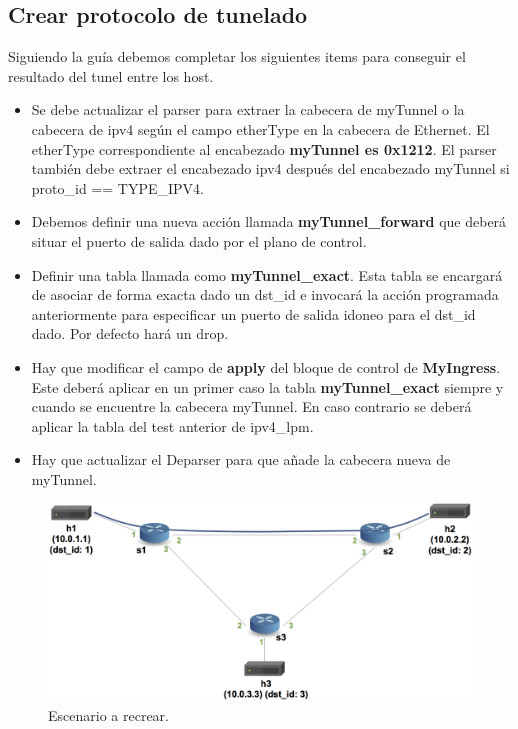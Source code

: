\subsection{Crear protocolo de tunelado}
Siguiendo la guía debemos completar los siguientes items para conseguir el resultado del tunel entre los host.
\begin{itemize}
    \item Se debe actualizar el parser para extraer la cabecera de  myTunnel o la cabecera de  ipv4 según el campo etherType en la cabecera de  Ethernet. El etherType correspondiente al encabezado \textbf{myTunnel es 0x1212}. El parser también debe extraer el encabezado ipv4 después del encabezado myTunnel si proto\_id == TYPE\_IPV4.
    
    \item  Debemos definir una nueva acción llamada \textbf{myTunnel\_forward} que deberá situar el puerto de salida dado por el plano de control.
    
    \item Definir una tabla llamada como \textbf{myTunnel\_exact}. Esta tabla se encargará de asociar de forma exacta dado un dst\_id e invocará la acción programada anteriormente para especificar un puerto de salida idoneo para el dst\_id dado. Por defecto hará un drop.
    
    \item Hay que modificar el campo de \textbf{apply} del bloque de control de \textbf{MyIngress}. Este deberá aplicar en un primer caso la tabla \textbf{myTunnel\_exact} siempre y cuando se encuentre la cabecera myTunnel. En caso contrario se deberá aplicar la tabla del test anterior de ipv4\_lpm.
    
    \item Hay que actualizar el Deparser para que añade la cabecera nueva de myTunnel.
\end{itemize}
\begin{figure}[!htb]
  \centering
    \includegraphics[width=\linewidth]{./img/test/8.png}
    \caption{Escenario a recrear.}
  \label{fig:yo}
\end{figure}
\newpage

